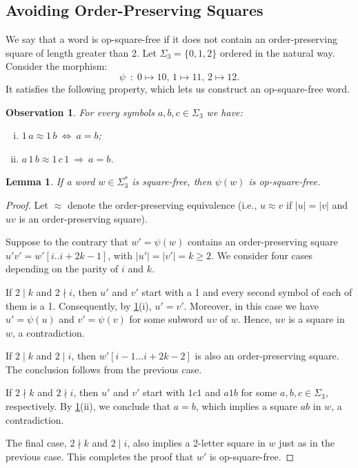 \documentclass{article}
\theoremstyle{plain}
\newtheorem{lemma}[theorem]{Lemma}
\newtheorem{observation}[theorem]{Observation}
\theoremstyle{definition}
\theoremstyle{remark}
\newcommand{\lleft}{\psi}
\begin{document}
\subsection{Avoiding Order-Preserving Squares}
  We say that a word is op-square-free if it does not contain an order-preserving square
  of length greater than 2.
  Let $\Sigma_3=\{0,1,2\}$ ordered in the natural way. Consider the morphism:
    \[ \lleft\ \;:\; 0\mapsto 10,\, 1\mapsto 11,\, 2\mapsto 12.\]
  It satisfies the following property, which lets us construct an op-square-free word. 

    \begin{observation}\label{obs:simple}
      For every symbols $a,b,c \in \Sigma_3$ we have:
      \begin{enumerate}[(i)]
        \item $1\,a\approx 1\,b\: \Leftrightarrow\: a=b$;
        \item $a\,1\,b\approx 1\,c\,1 \:\Rightarrow\: a=b$.
      \end{enumerate}
    \end{observation}

  \begin{lemma}\label{lem:left}
    If a word $w\in \Sigma_3^*$ is square-free, then $\lleft(w)$ is op-square-free.
  \end{lemma}

  \begin{proof}
    Let $\approx$ denote the order-preserving equivalence
    (i.e., $u \approx v$ if $|u|=|v|$ and $uv$ is an order-preserving square).

    \noindent
    Suppose to the contrary that $w'=\lleft(w)$ contains an order-preserving square
    $u'v'=w'[i..i+2k-1]$, with $|u'|=|v'|=k \ge 2$.
    We consider four cases depending on the parity of $i$ and $k$.

    If $2 \mid k$ and $2 \nmid i$, then $u'$ and $v'$ start with a 1 and every second symbol of each of them is a 1.
    Consequently, by \cref{obs:simple}(i), $u'=v'$.
    Moreover, in this case we have $u'=\lleft(u)$ and $v'=\lleft(v)$ for some subword $uv$ of $w$.
    Hence, $uv$ is a square in $w$, a contradiction.

    If $2 \mid k$ and $2 \mid i$, then $w'[i-1...i+2k-2]$ is also an order-preserving square.
    The conclusion follows from the previous case.

    If $2 \nmid k$ and $2 \nmid i$, then $u'$ and $v'$ start with $1c1$ and $a1b$ for some
    $a,b,c \in \Sigma_3$, respectively.
    By \cref{obs:simple}(ii), we conclude that $a=b$, which implies a square $ab$ in $w$, a contradiction.

    The final case, $2 \nmid k$ and $2 \mid i$, also implies a 2-letter square in $w$
    just as in the previous case.
    This completes the proof that $w'$ is op-square-free.
  \end{proof}
\end{document}
